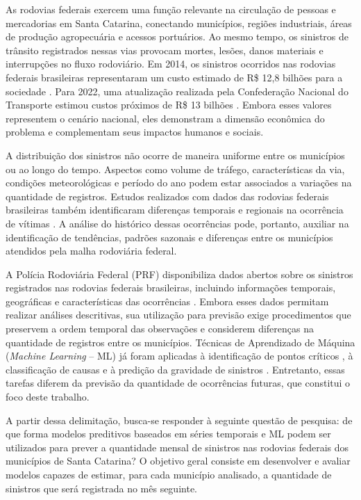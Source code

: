 \documentclass[12pt]{article}
\begin{document}
As rodovias federais exercem uma função relevante na circulação de pessoas e mercadorias em Santa Catarina, conectando municípios, regiões industriais, áreas de produção agropecuária e acessos portuários. Ao mesmo tempo, os sinistros de trânsito registrados nessas vias provocam mortes, lesões, danos materiais e interrupções no fluxo rodoviário. Em 2014, os sinistros ocorridos nas rodovias federais brasileiras representaram um custo estimado de R\$ 12,8 bilhões para a sociedade \cite{ipea2015acidentes}. Para 2022, uma atualização realizada pela Confederação Nacional do Transporte estimou custos próximos de R\$ 13 bilhões \cite{cnt2023acidentes}. Embora esses valores representem o cenário nacional, eles demonstram a dimensão econômica do problema e complementam seus impactos humanos e sociais.

A distribuição dos sinistros não ocorre de maneira uniforme entre os municípios ou ao longo do tempo. Aspectos como volume de tráfego, características da via, condições meteorológicas e período do ano podem estar associados a variações na quantidade de registros. Estudos realizados com dados das rodovias federais brasileiras também identificaram diferenças temporais e regionais na ocorrência de vítimas \cite{moraisneto2021tendencia}. A análise do histórico dessas ocorrências pode, portanto, auxiliar na identificação de tendências, padrões sazonais e diferenças entre os municípios atendidos pela malha rodoviária federal.

A Polícia Rodoviária Federal (PRF) disponibiliza dados abertos sobre os sinistros registrados nas rodovias federais brasileiras, incluindo informações temporais, geográficas e características das ocorrências \cite{prf2026dados}. Embora esses dados permitam realizar análises descritivas, sua utilização para previsão exige procedimentos que preservem a ordem temporal das observações e considerem diferenças na quantidade de registros entre os municípios. Técnicas de Aprendizado de Máquina (\textit{Machine Learning} -- ML) já foram aplicadas à identificação de pontos críticos \cite{santos2021machine}, à classificação de causas \cite{silva2024classificacao} e à predição da gravidade de sinistros \cite{mafort2025tecnicas}. Entretanto, essas tarefas diferem da previsão da quantidade de ocorrências futuras, que constitui o foco deste trabalho.

A partir dessa delimitação, busca-se responder à seguinte questão de pesquisa: de que forma modelos preditivos baseados em séries temporais e ML podem ser utilizados para prever a quantidade mensal de sinistros nas rodovias federais dos municípios de Santa Catarina? O objetivo geral consiste em desenvolver e avaliar modelos capazes de estimar, para cada município analisado, a quantidade de sinistros que será registrada no mês seguinte.
\end{document}
